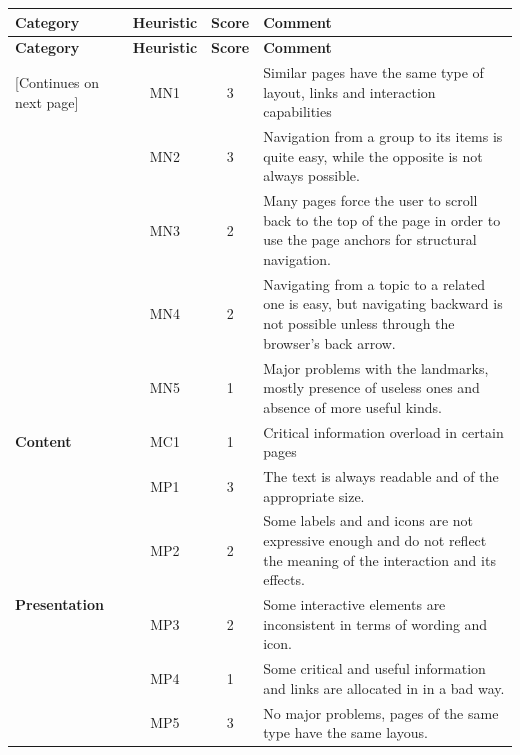 
\pagebreak

\begin{tabularx}{\linewidth}{l c c X}
\toprule
\textbf{Category} & \textbf{Heuristic} & \textbf{Score} & \textbf{Comment} \\
\midrule
\endfirsthead
\toprule
\textbf{Category} & \textbf{Heuristic} & \textbf{Score} & \textbf{Comment} \\
\midrule
\endhead
\midrule
\footnotesize [Continues on next page]
\endfoot
\bottomrule
\endlastfoot

\multirow{5}{*}{\textbf{Navigation}}   & MN1 & 3 & Similar pages have the same type of layout, links and interaction capabilities\\ \cmidrule{2-4} 
                                        & MN2 & 3 & Navigation from a group to its items is quite easy, while the opposite is not always possible.\\ \cmidrule{2-4} 
                                        & MN3 & 2 & Many pages force the user to scroll back to the top of the page in order to use the page anchors for structural navigation.\\ \cmidrule{2-4} 
                                        & MN4 & 2 & Navigating from a topic to a related one is easy, but navigating backward is not possible unless through the browser's back arrow.\\ \cmidrule{2-4} 
                                        & MN5 & 1 & Major problems with the landmarks, mostly presence of useless ones and absence of more useful kinds.\\ \midrule
\textbf{Content}                       & MC1 & 1 & Critical information overload in certain pages \\ \midrule
\multirow{5}{*}{\textbf{Presentation}} & MP1 & 3 & The text is always readable and of the appropriate size. \\ \cmidrule{2-4} 
                                        & MP2 & 2 & Some labels and and icons are not expressive enough and do not reflect the meaning of the interaction and its effects.\\ \cmidrule{2-4} 
                                        & MP3 & 2 & Some interactive elements are inconsistent in terms of wording and icon.\\ \cmidrule{2-4} 
                                        & MP4 & 1 & Some critical and useful information and links are allocated in in a bad way.\\ \cmidrule{2-4} 
                                        & MP5 & 3 & No major problems, pages of the same type have the same layous.
\end{tabularx}


